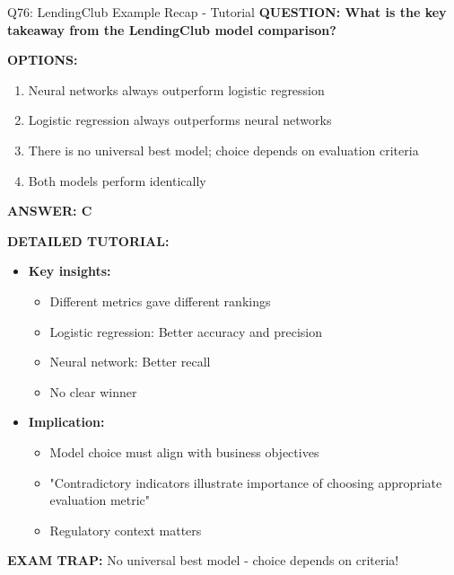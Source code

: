 \documentclass[8pt]{beamer}
\begin{document}
	\begin{frame}{Q76: LendingClub Example Recap - Tutorial}
		\fontsize{6.5}{7.5}\selectfont
		\textbf{QUESTION: What is the key takeaway from the LendingClub model comparison?}
		
		\vspace{0.1cm}
		\textbf{OPTIONS:}
		\begin{enumerate}
			\item Neural networks always outperform logistic regression
			\item Logistic regression always outperforms neural networks
			\item There is no universal best model; choice depends on evaluation criteria
			\item Both models perform identically
		\end{enumerate}
		
		\vspace{0.1cm}
		\textcolor{myblue}{\textbf{ANSWER: C}}
		
		\vspace{0.1cm}
		\textbf{DETAILED TUTORIAL:}
		\begin{itemize}
			\item \textbf{Key insights:}
			\begin{itemize}
				\item Different metrics gave different rankings
				\item Logistic regression: Better accuracy and precision
				\item Neural network: Better recall
				\item No clear winner
			\end{itemize}
			\item \textbf{Implication:}
			\begin{itemize}
				\item Model choice must align with business objectives
				\item "Contradictory indicators illustrate importance of choosing appropriate evaluation metric"
				\item Regulatory context matters
			\end{itemize}
		\end{itemize}
		
		\textcolor{myred}{\textbf{EXAM TRAP:}} No universal best model - \textcolor{myblue}{choice depends on criteria}!
	\end{frame}
	
\end{document}
